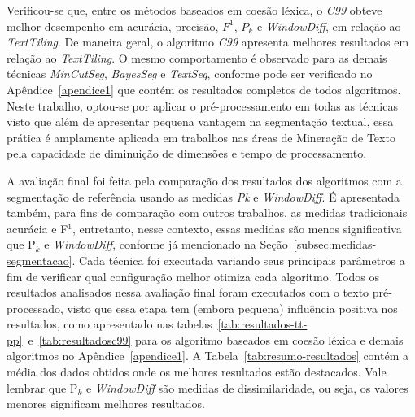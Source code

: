 Verificou-se que, entre os métodos baseados em coesão léxica, o \textit{C99} obteve melhor desempenho em acurácia, precisão, $F^1$, $P_k$ e \textit{WindowDiff}, em relação ao \textit{TextTiling}. De maneira geral, o algoritmo \textit{C99} apresenta melhores resultados em relação ao \textit{TextTiling}. 
O mesmo comportamento é observado para as demais técnicas \textit{MinCutSeg}, \textit{BayesSeg} e \textit{TextSeg}, conforme pode ser verificado no Apêndice~\ref{apendice1} que contém os resultados completos de todos algoritmos.
Neste trabalho, optou-se por aplicar o pré-processamento em todas as técnicas visto que além de apresentar pequena vantagem na segmentação textual, essa prática é amplamente aplicada em trabalhos nas áreas de Mineração de Texto pela capacidade de diminuição de dimensões e tempo de processamento. 











A avaliação final foi feita pela comparação dos resultados dos algoritmos com a segmentação de referência usando as medidas \textit{Pk} e \textit{WindowDiff}. É apresentada também, para fins de comparação com outros trabalhos, as medidas tradicionais acurácia e F$^1$, entretanto, nesse contexto, essas medidas são menos significativa que P$_k$ e \textit{WindowDiff}, conforme já mencionado na Seção~\ref{subsec:medidas-segmentacao}. 
Cada técnica foi executada variando seus principais parâmetros a fim de verificar qual configuração melhor otimiza cada algoritmo. 
Todos os resultados analisados nessa avaliação final foram executados com o texto pré-processado, visto que essa etapa tem (embora pequena) influência positiva nos resultados, como apresentado nas tabelas~\ref{tab:resultados-tt-pp}~e~\ref{tab:resultadosc99} para os algoritmo baseados em coesão léxica e demais algoritmos no Apêndice~\ref{apendice1}.
%
A Tabela~\ref{tab:resumo-resultados} contém a média dos dados obtidos onde os melhores resultados estão destacados. Vale lembrar que P$_k$ e \textit{WindowDiff} são medidas de dissimilaridade, ou seja, os valores menores significam melhores resultados.






